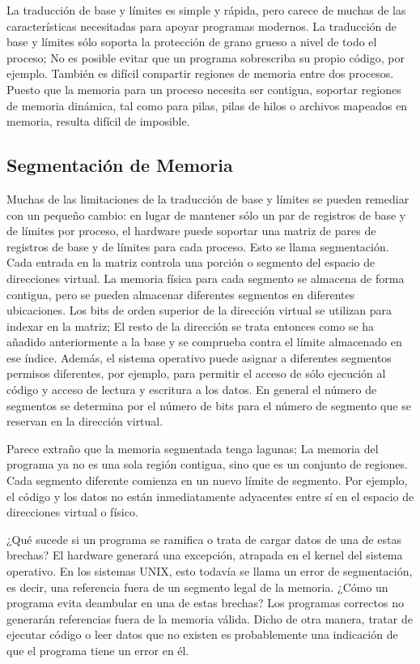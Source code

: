 \documentclass[10pt]{book}
\begin{document}
La traducción de base y límites es simple y rápida, pero carece de muchas de las características necesitadas para apoyar programas modernos. La traducción de base y límites sólo soporta la protección de grano grueso a nivel de todo el proceso; No es posible evitar que un programa sobrescriba su propio código, por ejemplo. También es difícil compartir regiones de memoria entre dos procesos. Puesto que la memoria para un proceso necesita ser contigua, soportar regiones de memoria dinámica, tal como para pilas, pilas de hilos o archivos mapeados en memoria, resulta difícil de imposible.

\subsection{Segmentación de Memoria}
Muchas de las limitaciones de la traducción de base y límites se pueden remediar con un pequeño cambio: en lugar de mantener sólo un par de registros de base y de límites por proceso, el hardware puede soportar una matriz de pares de registros de base y de límites para cada proceso. Esto se llama segmentación. Cada entrada en la matriz controla una porción o segmento del espacio de direcciones virtual. La memoria física para cada segmento se almacena de forma contigua, pero se pueden almacenar diferentes segmentos en diferentes ubicaciones. Los bits de orden superior de la dirección virtual se utilizan para indexar en la matriz; El resto de la dirección se trata entonces como se ha añadido anteriormente a la base y se comprueba contra el límite almacenado en ese índice. Además, el sistema operativo puede asignar a diferentes segmentos permisos diferentes, por ejemplo, para permitir el acceso de sólo ejecución al código y acceso de lectura y escritura a los datos. En general el número de segmentos se determina por el número de bits para el número de segmento que se reservan en la dirección virtual.

Parece extraño que la memoria segmentada tenga lagunas; La memoria del programa ya no es una sola región contigua, sino que es un conjunto de regiones. Cada segmento diferente comienza en un nuevo límite de segmento. Por ejemplo, el código y los datos no están inmediatamente adyacentes entre sí en el espacio de direcciones virtual o físico.

¿Qué sucede si un programa se ramifica o trata de cargar datos de una de estas brechas? El hardware generará una excepción, atrapada en el kernel del sistema operativo. En los sistemas UNIX, esto todavía se llama un error de segmentación, es decir, una referencia fuera de un segmento legal de la memoria. ¿Cómo un programa evita deambular en una de estas brechas? Los programas correctos no generarán referencias fuera de la memoria válida. Dicho de otra manera, tratar de ejecutar código o leer datos que no existen es probablemente una indicación de que el programa tiene un error en él.
\end{document}
